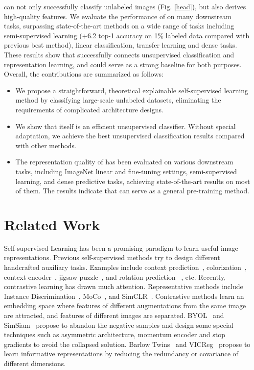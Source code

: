 \documentclass[10pt,twocolumn,letterpaper]{article}
\begin{document}
\ourmethod can not only successfully classify unlabeled images (Fig. \ref{head}), but also derives high-quality features. We evaluate the performance of \ourmethod on many downstream tasks, surpassing state-of-the-art methods on a wide range of tasks including semi-supervised learning (+6.2 top-1 accuracy on 1\% labeled data compared with previous best method), linear classification, transfer learning and dense tasks. These results show that \ourmethod successfully connects unsupervised classification and representation learning, and could serve as a strong baseline for both purposes. Overall, the contributions are summarized as follows:
\begin{itemize}
    \item 
    We propose a straightforward, theoretical explainable self-supervised learning method by classifying large-scale unlabeled datasets, eliminating the requirements of complicated architecture designs.
    \item 
    We show that \ourmethod itself is an efficient unsupervised classifier. Without special adaptation, we achieve the best unsupervised classification results compared with other methods.
    \item 
    The representation quality of \ourmethod has been evaluated on various downstream tasks, including ImageNet linear and fine-tuning settings, semi-supervised learning, and dense predictive tasks, achieving state-of-the-art results on most of them. The results indicate that \ourmethod can serve as a general pre-training method.
\end{itemize}

\section{Related Work}
Self-supervised Learning has been a promising paradigm to learn useful image representations. Previous self-supervised methods try to design different handcrafted auxiliary tasks. Examples include context prediction~\cite{doersch2015unsupervised}, colorization~\cite{zhang2016colorful}, context encoder~\cite{pathak2016context}, jigsaw puzzle~\cite{noroozi2016unsupervised}, and rotation prediction ~\cite{gidaris2018unsupervised}, etc. 
Recently, contrastive learning has drawn much attention. Representative methods include Instance Discrimination~\cite{wu2018unsupervised}, MoCo~\cite{he2020momentum, chen2020improved}, and SimCLR~\cite{chen2020simple}. Contrastive methods learn an embedding space where features of different augmentations from the same image are attracted, and features of different images are separated. BYOL~\cite{grill2020bootstrap} and SimSiam~\cite{chen2021exploring} propose to abandon the negative samples and design some special techniques such as asymmetric architecture, momentum encoder and stop gradients to avoid the collapsed solution. Barlow Twins~\cite{zbontar2021barlow} and VICReg~\cite{bardes2021vicreg} propose to learn informative representations by reducing the redundancy or covariance of different dimensions. 
\end{document}
